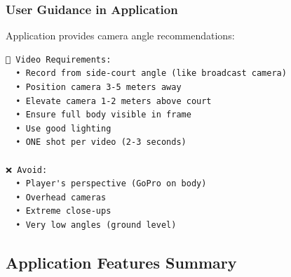 \documentclass[11pt,a4paper]{article}
\begin{document}
\subsubsection{User Guidance in Application}

Application provides camera angle recommendations:

\begin{verbatim}
📖 Video Requirements:
  • Record from side-court angle (like broadcast camera)
  • Position camera 3-5 meters away
  • Elevate camera 1-2 meters above court
  • Ensure full body visible in frame
  • Use good lighting
  • ONE shot per video (2-3 seconds)

❌ Avoid:
  • Player's perspective (GoPro on body)
  • Overhead cameras
  • Extreme close-ups
  • Very low angles (ground level)
\end{verbatim}

\subsection{Application Features Summary}
\end{document}
